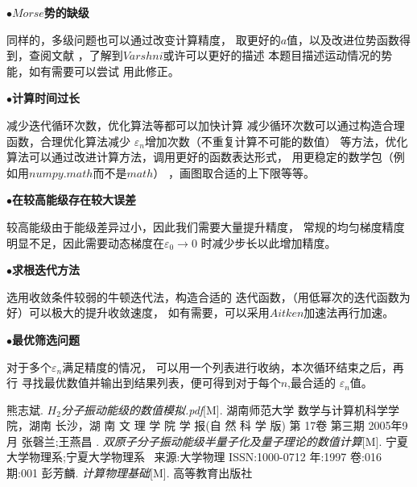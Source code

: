 \documentclass[11pt, a4paper, oneside]{ctexart}
\begin{document}
{{{{    {\vspace{5mm}
    $\bullet${\bfseries{$Morse$势的缺级}}
    \par 同样的，多级问题也可以通过改变计算精度，
    取更好的$a$值，以及改进位势函数得到，查阅文献
    \cite{a}，了解到$Varshni$或许可以更好的描述
    本题目描述运动情况的势能，如有需要可以尝试
    用此修正。
    }

    {
    \vspace{5mm}
    $\bullet${\bfseries{计算时间过长}}
    \par 减少迭代循环次数，优化算法等都可以加快计算
    减少循环次数可以通过构造合理函数，合理优化算法减少
    $\varepsilon_n$增加次数（不重复计算不可能的数值）
    等方法，优化算法可以通过改进计算方法，调用更好的函数表达形式，
    用更稳定的数学包（例如用$numpy.math$而不是$math$）
    ，画图取合适的上下限等等。
    }

    {
    \vspace{5mm}
    $\bullet${\bfseries{在较高能级存在较大误差}}
    \par 较高能级由于能级差异过小，因此我们需要大量提升精度，
    常规的均匀梯度精度明显不足，因此需要动态梯度在$\varepsilon_0\to 0$
    时减少步长以此增加精度。
    }

    {
    \vspace{5mm}
    $\bullet${\bfseries{求根迭代方法}}
    \par 选用收敛条件较弱的牛顿迭代法，构造合适的
    迭代函数，（用低幂次的迭代函数为好）可以极大的提升收敛速度，
    如有需要，可以采用$Aitken$加速法再行加速。
    }

    {
    \vspace{5mm}
    $\bullet${\bfseries{最优筛选问题}}
    \par 对于多个$\varepsilon_n$满足精度的情况，
    可以用一个列表进行收纳，本次循环结束之后，再行
    寻找最优数值并输出到结果列表，便可得到对于每个$n$,最合适的
    $\varepsilon_n$值。
    }

    
}



\newpage

\begin{thebibliography}{99}
    熊志斌. \emph{$H_2$分子振动能级的数值模拟.pdf}[M]. 湖南师范大学 数学与计算机科学学院，湖南 长沙，湖 南 文 理 学 院 学 报(自 然 科 学 版) 第 17卷 第三期 2005年9月
    张磬兰;王燕昌 . \emph{双原子分子振动能级半量子化及量子理论的数值计算}[M]. 宁夏大学物理系;宁夏大学物理系 \ 来源:大学物理 ISSN:1000-0712 年:1997 卷:016 期:001
    彭芳麟. \emph{计算物理基础}[M]. 高等教育出版社
    

\end{thebibliography}}}}
\end{document}
